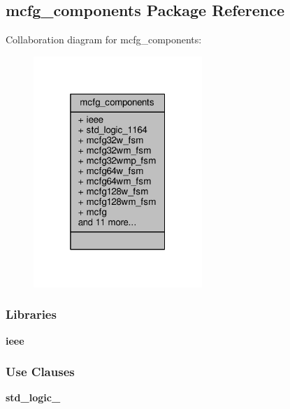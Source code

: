 \subsection{mcfg\+\_\+components Package Reference}
\label{classmcfg__components}


Collaboration diagram for mcfg\+\_\+components\+:\nopagebreak
\begin{figure}[H]
\begin{center}
\leavevmode
\includegraphics[width=181pt]{de/dfd/classmcfg__components__coll__graph}
\end{center}
\end{figure}
\subsubsection*{Libraries}
 \begin{DoxyCompactItemize}
\item 
{\bf ieee} 
\end{DoxyCompactItemize}
\subsubsection*{Use Clauses}
 \begin{DoxyCompactItemize}
\item 
{\bf std\+\_\+logic\+\_}   
\end{DoxyCompactItemize}
